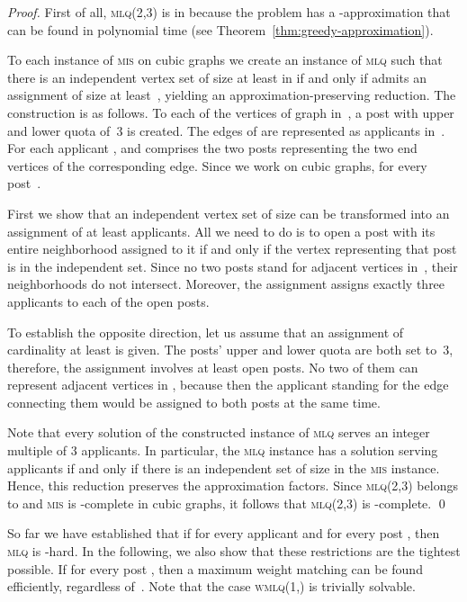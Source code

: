 \documentclass{llncs}
\begin{document}
\begin{proof}
	First of all, \textsc{mlq(2,3)} is in  because the problem has a -approx\-ima\-tion that can be found in polynomial time (see Theorem~\ref{thm:greedy-approximation}).
	
	To each instance  of \textsc{mis} on cubic graphs we create an instance  of \textsc{mlq} such that there is an independent vertex set of size at least  in  if and only if  admits an assignment of size at least~, yielding an approximation-preserving reduction.  The construction is as follows. To each of the  vertices of graph  in~, a post with upper and lower quota of~3 is created. The  edges of  are represented as  applicants in~. For each applicant ,  and  comprises the two posts representing the two end vertices of the corresponding edge. Since we work on cubic graphs,  for every post~.
	
	First we show that an independent vertex set of size  can be transformed into an assignment of at least  applicants. All we need to do is to open a post with its entire neighborhood assigned to it if and only if the vertex representing that post is in the independent set. Since no two posts stand for adjacent vertices in~, their neighborhoods do not intersect. Moreover, the assignment assigns exactly three applicants to each of the  open posts.
	
	To establish the opposite direction, let us assume that an assignment of cardinality at least  is given. The posts' upper and lower quota are both set to~3, therefore, the assignment involves at least  open posts. No two of them can represent adjacent vertices in , because then the applicant standing for the edge connecting them would be assigned to both posts at the same time.
    
Note that every solution of the constructed instance of \textsc{mlq} serves an integer multiple of 3 applicants. In particular, the \textsc{mlq} instance has a solution serving  applicants if and only if there is an independent set of size  in the \textsc{mis} instance. Hence, this reduction  preserves the approximation factors. Since \textsc{mlq(2,3)} belongs to  and \textsc{mis} is -complete in cubic graphs, it follows that \textsc{mlq(2,3)} is -complete.
\qed
\end{proof}

So far we have established that if  for every applicant  and  for every post , then \textsc{mlq} is -hard. In the following, we also show that these restrictions are the tightest possible. If  for every post , then a maximum weight matching can be found efficiently, regardless of~. Note that the case \textsc{wmlq(1,)} is trivially solvable.
\end{document}
